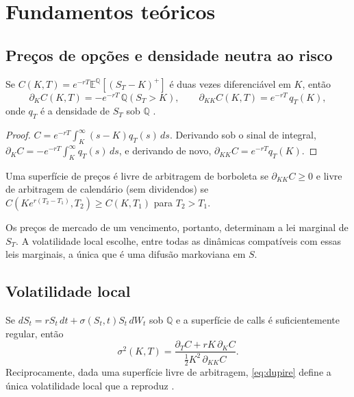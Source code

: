 \section{Fundamentos teóricos}

\subsection{Preços de opções e densidade neutra ao risco}

\begin{teorema}\label{teo:bl}
Se $C(K,T)=e^{-rT}\mathbb E^{\mathbb Q}[(S_T-K)^+]$ é duas vezes diferenciável em $K$, então
\begin{equation}\label{eq:bl}
\partial_KC(K,T)=-e^{-rT}\,\mathbb Q(S_T>K),\qquad \partial_{KK}C(K,T)=e^{-rT}\,q_T(K),
\end{equation}
onde $q_T$ é a densidade de $S_T$ sob $\mathbb Q$ \citep{breedenlitzenberger1978}.
\end{teorema}

\begin{proof}
$C=e^{-rT}\int_K^\infty(s-K)q_T(s)\,ds$. Derivando sob o sinal de integral, $\partial_KC=-e^{-rT}\int_K^\infty q_T(s)\,ds$, e derivando de novo, $\partial_{KK}C=e^{-rT}q_T(K)$.
\end{proof}

\begin{corolario}
Uma superfície de preços é livre de arbitragem de borboleta se $\partial_{KK}C\ge0$ e livre de arbitragem de calendário (sem dividendos) se $C(K e^{r(T_2-T_1)},T_2)\ge C(K,T_1)$ para $T_2>T_1$.
\end{corolario}

Os preços de mercado de um vencimento, portanto, determinam a lei marginal de $S_T$. A volatilidade local escolhe, entre todas as dinâmicas compatíveis com essas leis marginais, a única que é uma difusão markoviana em $S$.

\subsection{Volatilidade local}

\begin{teorema}[Dupire]\label{teo:dupire}
Se $dS_t=rS_t\,dt+\sigma(S_t,t)S_t\,dW_t$ sob $\mathbb Q$ e a superfície de calls é suficientemente regular, então
\begin{equation}\label{eq:dupire}
\sigma^2(K,T)=\frac{\partial_TC+rK\,\partial_KC}{\tfrac12K^2\,\partial_{KK}C}.
\end{equation}
Reciprocamente, dada uma superfície livre de arbitragem, \eqref{eq:dupire} define a única volatilidade local que a reproduz \citep{dupire1994}.
\end{teorema}

